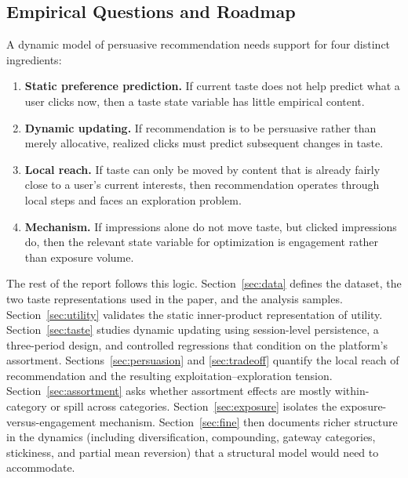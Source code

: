 \documentclass[11pt]{article}
\begin{document}
\subsection{Empirical Questions and Roadmap}

A dynamic model of persuasive recommendation needs support for four distinct ingredients:

\begin{enumerate}[leftmargin=1.5em, itemsep=0.25em, topsep=0.25em]
    \item \textbf{Static preference prediction.} If current taste does not help predict what a user clicks now, then a taste state variable has little empirical content.
    \item \textbf{Dynamic updating.} If recommendation is to be persuasive rather than merely allocative, realized clicks must predict subsequent changes in taste.
    \item \textbf{Local reach.} If taste can only be moved by content that is already fairly close to a user's current interests, then recommendation operates through local steps and faces an exploration problem.
    \item \textbf{Mechanism.} If impressions alone do not move taste, but clicked impressions do, then the relevant state variable for optimization is engagement rather than exposure volume.
\end{enumerate}

The rest of the report follows this logic. Section~\ref{sec:data} defines the dataset, the two taste representations used in the paper, and the analysis samples. Section~\ref{sec:utility} validates the static inner-product representation of utility. Section~\ref{sec:taste} studies dynamic updating using session-level persistence, a three-period design, and controlled regressions that condition on the platform's assortment. Sections~\ref{sec:persuasion} and \ref{sec:tradeoff} quantify the local reach of recommendation and the resulting exploitation--exploration tension. Section~\ref{sec:assortment} asks whether assortment effects are mostly within-category or spill across categories. Section~\ref{sec:exposure} isolates the exposure-versus-engagement mechanism. Section~\ref{sec:fine} then documents richer structure in the dynamics (including diversification, compounding, gateway categories, stickiness, and partial mean reversion) that a structural model would need to accommodate.
\end{document}
